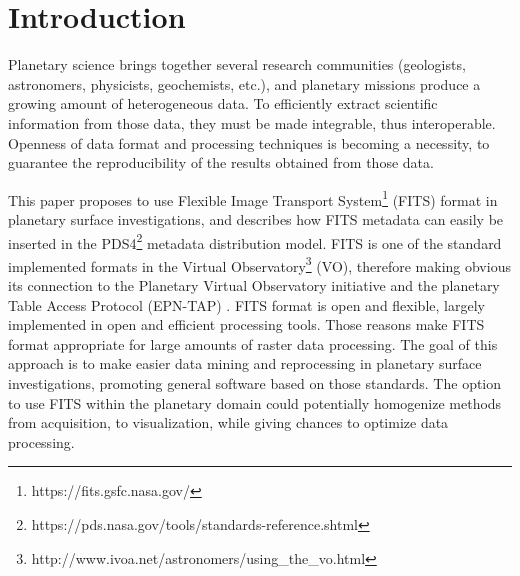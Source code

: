 
% 
% 
% 


\section{Introduction}
\label{sec:intro}
Planetary science brings together several research communities
(geologists, astronomers, physicists, geochemists, etc.),
and planetary missions produce a growing amount of heterogeneous data.
To efficiently extract scientific information from those data, they must
be made integrable, thus interoperable.
Openness of data format and processing techniques is becoming a necessity,
to guarantee the reproducibility of the results obtained from those data.

This paper proposes to use Flexible Image Transport
System\footnote{https://fits.gsfc.nasa.gov/}
(FITS) format \citep{fitsorig,fitsver3} in planetary surface investigations,
and describes how FITS metadata can easily be inserted in the
PDS4\footnote{https://pds.nasa.gov/tools/standards-reference.shtml}
metadata distribution model.
FITS is one of the standard implemented formats in the Virtual
Observatory\footnote{http://www.ivoa.net/astronomers/using\_the\_vo.html}
(VO), therefore making obvious its connection to the Planetary Virtual
Observatory initiative and the planetary Table Access Protocol (EPN-TAP)
\citep{ERARDepntap}.
FITS format is open and flexible, largely implemented in open and efficient
processing tools.
Those reasons make FITS format appropriate for large amounts of raster data
processing.
The goal of this approach is to make easier data mining and reprocessing
in planetary surface investigations, promoting general software based on those
standards.
The option to use FITS within the planetary domain could potentially
homogenize methods from acquisition, to visualization, while
giving chances to optimize data processing.

